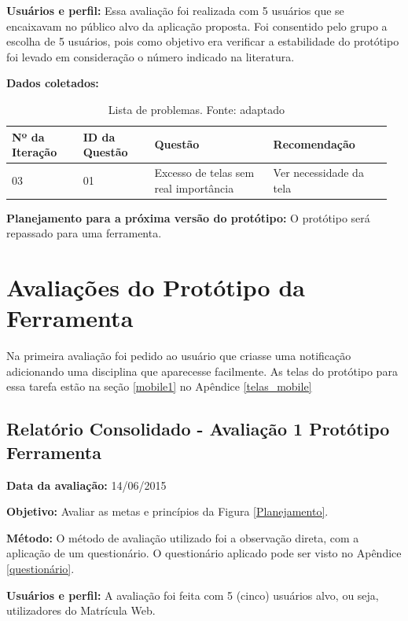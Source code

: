 \textbf{Usuários e perfil:}
Essa avaliação foi realizada com 5 usuários que se encaixavam no público alvo da aplicação proposta. 
Foi consentido pelo grupo a escolha de 5 usuários, pois como objetivo era verificar a estabilidade
do protótipo foi levado em consideração o número indicado na literatura.

\textbf{Dados coletados:}

\begin{table}[!h]
\caption{Lista de problemas. Fonte: \cite{preece} adaptado}
\label{tab:problema}
  \begin{tabular}{p{0.18\linewidth}p{0.18\linewidth}p{0.30\linewidth}p{0.30\linewidth}}
  \hline
    Nº da Iteração & ID da Questão & Questão & Recomendação\\
 \hline
    03 & 01 & Excesso de telas sem real importância & Ver necessidade da tela\\
  \end{tabular}
\end{table}

\textbf{Planejamento para a próxima versão do protótipo:}
O protótipo será repassado para uma ferramenta.

\vfill
\pagebreak

\section{Avaliações do Protótipo da Ferramenta}

Na primeira avaliação foi pedido ao usuário que criasse uma notificação adicionando uma disciplina que aparecesse facilmente. As telas do protótipo para essa tarefa
estão na seção \ref{mobile1} no Apêndice \ref{telas_mobile}

  \subsection{Relatório Consolidado - Avaliação 1 Protótipo Ferramenta}

  \flushleft \textbf{Data da avaliação:} 
  14/06/2015

  \textbf{Objetivo:}
  Avaliar as metas e princípios da Figura \ref{Planejamento}.

  \textbf{Método:}
  O método de avaliação utilizado foi a observação direta, com a aplicação de um questionário. O questionário aplicado pode ser visto no 
  Apêndice \ref{questionário}.

  \textbf{Usuários e perfil:}
  A avaliação foi feita com 5 (cinco) usuários alvo, ou seja, utilizadores do Matrícula Web.
  
